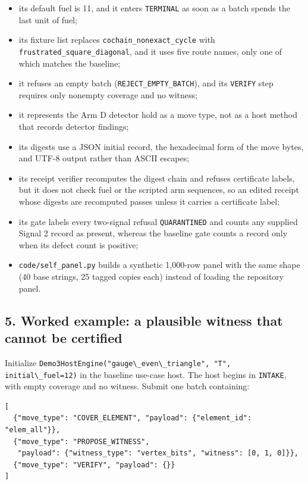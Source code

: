 \documentclass[
  11pt,
]{article}
\newcommand{\passthrough}[1]{#1}
\providecommand{\tightlist}{%
  \setlength{\itemsep}{0pt}\setlength{\parskip}{0pt}}
\begin{document}
\begin{itemize}
\tightlist
\item
  its default fuel is 11, and it enters
  \passthrough{\lstinline!TERMINAL!} as soon as a batch spends the last
  unit of fuel;
\item
  its fixture list replaces \nolinkurl{cochain_nonexact_cycle} with
  \nolinkurl{frustrated_square_diagonal}, and it uses five route names,
  only one of which matches the baseline;
\item
  it refuses an empty batch (\nolinkurl{REJECT_EMPTY_BATCH}), and its
  \passthrough{\lstinline!VERIFY!} step requires only nonempty coverage
  and no witness;
\item
  it represents the Arm D detector hold as a move type, not as a host
  method that records detector findings;
\item
  its digests use a JSON initial record, the hexadecimal form of the
  move bytes, and UTF-8 output rather than ASCII escapes;
\item
  its receipt verifier recomputes the digest chain and refuses
  certificate labels, but it does not check fuel or the scripted arm
  sequences, so an edited receipt whose digests are recomputed passes
  unless it carries a certificate label;
\item
  its gate labels every two-signal refusal
  \passthrough{\lstinline!QUARANTINED!} and counts any supplied Signal 2
  record as present, whereas the baseline gate counts a record only when
  its defect count is positive;
\item
  \nolinkurl{code/self_panel.py} builds a synthetic 1,000-row panel with
  the same shape (40 base strings, 25 tagged copies each) instead of
  loading the repository panel.
\end{itemize}

\subsection{5. Worked example: a plausible witness that cannot be
certified}\label{worked-example-a-plausible-witness-that-cannot-be-certified}

Initialize
\passthrough{\lstinline!Demo3HostEngine("gauge\_even\_triangle", "T", initial\_fuel=12)!}
in the baseline use-case host. The host begins in
\passthrough{\lstinline!INTAKE!}, with empty coverage and no witness.
Submit one batch containing:

\begin{lstlisting}
[
  {"move_type": "COVER_ELEMENT", "payload": {"element_id": "elem_all"}},
  {"move_type": "PROPOSE_WITNESS",
   "payload": {"witness_type": "vertex_bits", "witness": [0, 1, 0]}},
  {"move_type": "VERIFY", "payload": {}}
]
\end{lstlisting}
\end{document}
